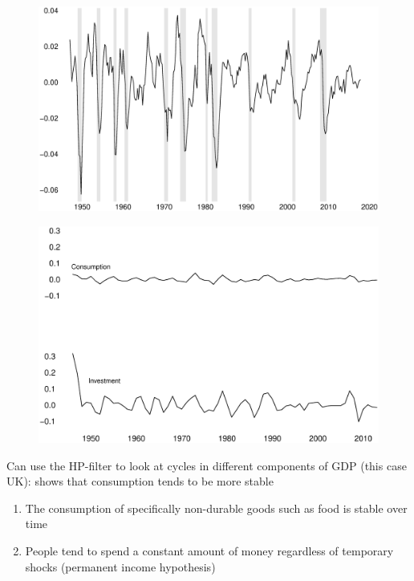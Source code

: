 \documentclass{beamer}
\begin{document}
\begin{frame}
  \begin{figure}
    \includegraphics[scale=.3]{hp_filter2.eps}
  \end{figure}
\end{frame}

\begin{frame}
  \begin{figure}
    \includegraphics[scale=.3]{uk_ci.eps}
  \end{figure}
\end{frame}

\begin{frame}
  Can use the HP-filter to look at cycles in different components of GDP (this case UK): shows that consumption tends to be more stable
  \begin{enumerate}
    \item The consumption of specifically non-durable goods such as food is stable over time
    \item People tend to spend a constant amount of money regardless of temporary shocks (permanent income hypothesis)
  \end{enumerate}
\end{frame}
\end{document}
